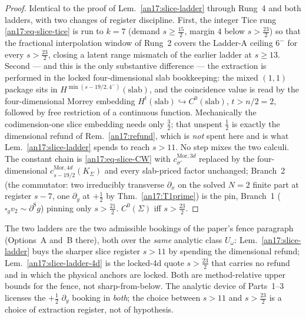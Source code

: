 \begin{proof}
Identical to the proof of Lem.~\ref{an17:slice-ladder} through Rung~4 and both
ladders, with two changes of register discipline. First, the integer Tice rung
\eqref{an17:eq-slice-tice} is run to $k=7$ (demand $s\ge\tfrac{15}2$, margin
$4$ below $s>\tfrac{23}2$) so that the fractional interpolation window of Rung~2
covers the Ladder-A ceiling $6^-$ for every $s>\tfrac{23}2$, closing a latent
range mismatch of the earlier ladder at $s\ge13$. Second --- and this is the only
substantive difference --- the extraction is performed in the locked
four-dimensional slab bookkeeping: the mixed $(1,1)$ package sits in
$H^{\min(s-19/2,4^-)}(\mathrm{slab})$, and the coincidence value is read by the
four-dimensional Morrey embedding $H^{t}(\mathrm{slab})\hookrightarrow
C^0(\mathrm{slab})$, $t>n/2=2$, followed by free restriction of a continuous
function. Mechanically the codimension-one slice embedding needs only $\tfrac32$;
that unspent $\tfrac12$ is exactly the dimensional refund of
Rem.~\ref{an17:refund}, which is \emph{not} spent here and is what
Lem.~\ref{an17:slice-ladder} spends to reach $s>11$. No step mixes the two
calculi. The constant chain is \eqref{an17:eq-slice-CW} with
$c^{\mathrm{Mor},3d}_{\sigma'}$ replaced by the four-dimensional
$c^{\mathrm{Mor},4d}_{s-19/2}(K_\Sigma)$ and every slab-priced factor unchanged;
Branch~2 (the commutator: two irreducibly transverse $\partial_x$ on the solved
$N{=}2$ finite part at register $s-7$, one $\partial_y$ at $+\tfrac12$ by
Thm.~\ref{an17:T1prime}) is the pin, Branch~1 ($\square_gv_2\sim\partial^8g$)
pinning only $s>\tfrac{21}2$. $C^0(\Sigma)$ iff $s>\tfrac{23}2$.
\end{proof}

\begin{remark}\label{an17:two-registers}
The two ladders are the two admissible bookings of the paper's fence paragraph
(Options~A and~B there), both over the \emph{same} analytic class $U_\omega$:
Lem.~\ref{an17:slice-ladder} buys the sharper slice register $s>11$ by spending
the dimensional refund; Lem.~\ref{an17:slice-ladder-4d} is the locked-4d quote
$s>\tfrac{23}2$ that carries no refund and in which the physical anchors are
locked. Both are method-relative upper bounds for the fence, not
sharp-from-below. The analytic device of Parts~1--3 licenses the $+\tfrac12$
$\partial_y$ booking in \emph{both}; the choice between $s>11$ and
$s>\tfrac{23}2$ is a choice of extraction register, not of hypothesis.
\end{remark}

